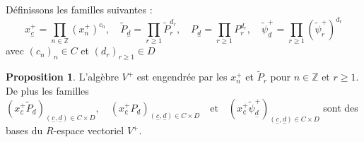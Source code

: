 \documentclass[12pt]{article}
\theoremstyle{definition}
\newtheorem{Prop}{Proposition}[section]
\begin{document}
Définissons les familles suivantes : $$x_{\underset{-}{c}}^+=\underset{n\in\mathbb{Z}}{\prod}(x_n^+)^{c_n},\quad \widetilde{P}_{\underset{-}{d}}=\underset{r\geqslant 1}{\prod}\widetilde{P}_r^{d_r},\quad P_{\underset{-}{d}}=\underset{r\geqslant 1}{\prod}P_r^{d_r},\quad \widetilde{\psi}_{\underset{-}{d}}^+=\underset{r\geqslant 1}{\prod}(\widetilde{\psi}_r^+)^{d_r}$$ avec $(c_n)_n\in C$ et $(d_r)_{r\geqslant 1}\in D$\\ 
\begin{Prop} L'algèbre $V^+$ est engendrée par les $x_n^+$ et $\tilde{P}_r$ pour $n\in\mathbb{Z}$ et $r\geqslant1$. De plus les familles $(x_{\underset{-}{c}}^+\tilde{P}_{\underset{-}{d}})_{({\underset{-}{c}},\underset{-}{d})\in C\times D},\quad (x_{\underset{-}{c}}^+ P_{\underset{-}{d}})_{({\underset{-}{c}},\underset{-}{d})\in C\times D}\quad\mbox{et}\quad(x_{\underset{-}{c}}^+\tilde{\psi}_{\underset{-}{d}}^+)_{(\underset{-}{c},{\underset{-}{d}})\in C\times D}$ sont des bases du $R$-espace vectoriel $V^+$.\end{Prop}
\end{document}
